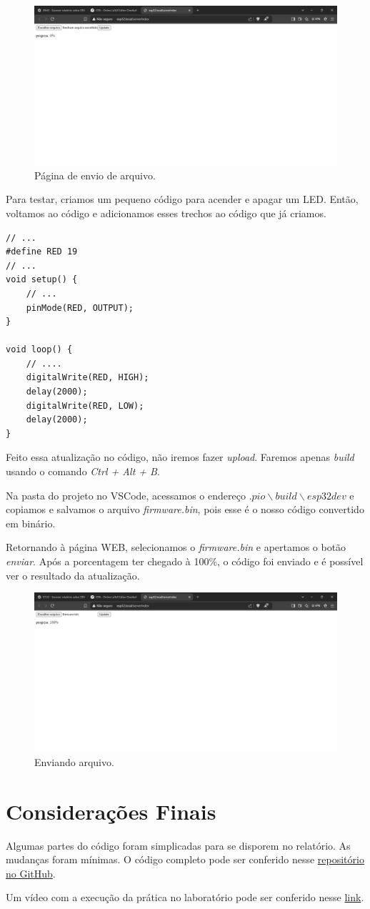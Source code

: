 \documentclass[12pt]{article}
\begin{document}
\begin{figure}[H]
    \centering
    \includegraphics[width=0.5\linewidth]{img/Captura de tela 2024-12-05 194720.jpg}
    \caption{Página de envio de arquivo.}
    \label{fig:serverIndex}
\end{figure}

Para testar, criamos um pequeno código para acender e apagar um LED. Então, voltamos ao código e adicionamos esses trechos ao código que já criamos.

\begin{lstlisting}
// ...
#define RED 19
// ...
void setup() {
    // ...
    pinMode(RED, OUTPUT);
}

void loop() {
    // ....
    digitalWrite(RED, HIGH);
    delay(2000);
    digitalWrite(RED, LOW);
    delay(2000);
}
\end{lstlisting}

Feito essa atualização no código, não iremos fazer \textit{upload}. Faremos apenas \textit{build} usando o comando \textit{Ctrl + Alt + B}.

Na pasta do projeto no VSCode, acessamos o endereço $.pio \backslash build \backslash esp32dev$ e copiamos e salvamos o arquivo \textit{firmware.bin}, pois esse é o nosso código convertido em binário.

Retornando à página WEB, selecionamos o \textit{firmware.bin} e apertamos o botão \textit{enviar}. Após a porcentagem ter chegado à 100\%, o código foi enviado e é possível ver o resultado da atualização.

\begin{figure}[H]
    \centering
    \includegraphics[width=0.5\linewidth]{img/Captura de tela 2024-12-05 194905.jpg}
    \caption{Enviando arquivo.}
    \label{fig:sending}
\end{figure}

\section{Considerações Finais}

Algumas partes do código foram simplicadas para se disporem no relatório. As mudanças foram mínimas. O código completo pode ser conferido nesse \href{https://github.com/fabricio-araujo94/microcontroladores/tree/main/ota_}{repositório no GitHub}.

Um vídeo com a execução da prática no laboratório pode ser conferido nesse \href{https://youtube.com/shorts/Of_eVqhS5-g?feature=share}{link}.
\end{document}
